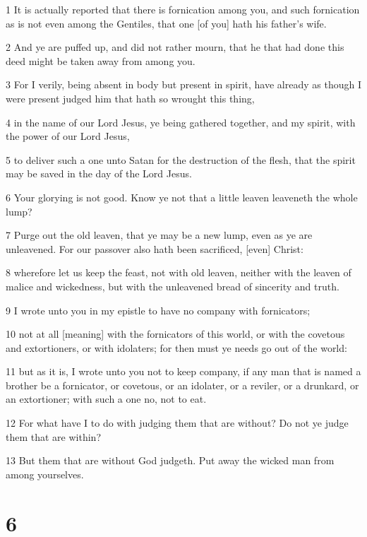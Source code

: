 \par 1 It is actually reported that there is fornication among you, and such fornication as is not even among the Gentiles, that one [of you] hath his father's wife.
\par 2 And ye are puffed up, and did not rather mourn, that he that had done this deed might be taken away from among you.
\par 3 For I verily, being absent in body but present in spirit, have already as though I were present judged him that hath so wrought this thing,
\par 4 in the name of our Lord Jesus, ye being gathered together, and my spirit, with the power of our Lord Jesus,
\par 5 to deliver such a one unto Satan for the destruction of the flesh, that the spirit may be saved in the day of the Lord Jesus.
\par 6 Your glorying is not good. Know ye not that a little leaven leaveneth the whole lump?
\par 7 Purge out the old leaven, that ye may be a new lump, even as ye are unleavened. For our passover also hath been sacrificed, [even] Christ:
\par 8 wherefore let us keep the feast, not with old leaven, neither with the leaven of malice and wickedness, but with the unleavened bread of sincerity and truth.
\par 9 I wrote unto you in my epistle to have no company with fornicators;
\par 10 not at all [meaning] with the fornicators of this world, or with the covetous and extortioners, or with idolaters; for then must ye needs go out of the world:
\par 11 but as it is, I wrote unto you not to keep company, if any man that is named a brother be a fornicator, or covetous, or an idolater, or a reviler, or a drunkard, or an extortioner; with such a one no, not to eat.
\par 12 For what have I to do with judging them that are without? Do not ye judge them that are within?
\par 13 But them that are without God judgeth. Put away the wicked man from among yourselves.

\chapter{6}

